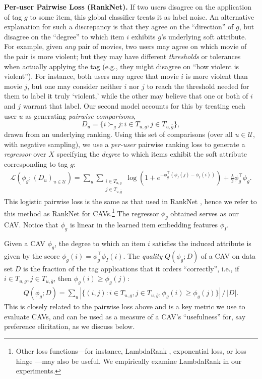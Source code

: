 \documentclass[manuscript,screen,nonacm]{acmart}
\newcommand{\1}{{\mathbf 1}}
\newcommand{\calU}{\mathcal{U}}
\newcommand{\calL}{\mathcal{L}}
\newcommand{\olg}{\overline{g}}
\theoremstyle{TheoremNum}
\begin{document}
\vskip 2mm
\noindent
\textbf{Per-user Pairwise Loss (RankNet).}\hspace*{2mm}
If two users disagree on the application of tag $g$ to some item, this global classifier treats it as label noise. An alternative explanation for such a discrepancy is that they agree on the ``direction'' of $g$, but disagree on the ``degree'' to which item $i$ exhibits $g$'s underlying soft attribute. For example, given \emph{any} pair of movies, two users may agree on which movie of the pair is more violent; but they may have different \emph{thresholds} or tolerances when actually applying the tag (e.g., they might disagree on ``how violent is violent''). For instance, both users may agree that movie $i$ is more violent than movie $j$, but one may consider neither $i$ nor $j$ to reach the threshold needed for them to label it truly `violent,' while the other may believe that one or both of $i$ and $j$ warrant that label. Our second model accounts for this by treating each user $u$ as generating \emph{pairwise comparisons}, 
$$D_u = \{i \succ_g j: i\in T_{u,g}, j\in T_{u,\olg} \},$$
drawn from an underlying ranking.
Using this set of comparisons (over all $u\in\calU$, with negative sampling),
we use a \emph{per-user} pairwise ranking loss to generate a \emph{regressor} over $X$ specifying the
\emph{degree} to which items exhibit the
 soft attribute corresponding to tag $g$:
\begin{align}
\calL(\phi_g; (D_u)_{u\in\calU}) = \!\!\sum_u \sum_{\substack{i\in T_{u,g}\\ j\in T_{u,\olg}}} \!\!\log (1 + e^{- \phi_g^\top(\phi_I(j) - \phi_I(i))})\! +\! \frac{\lambda}{2} \phi_g^\top \phi_g.
\label{eq:rankingloss}
\end{align}
This logistic pairwise loss is the same as that used in RankNet \cite{RankNet2005}, hence we refer to this method as RankNet for CAVs.\footnote{Other loss functions---for instance, LambdaRank \cite{burges2010ranknet}, exponential loss, or loss hinge \cite{cao2006adapting}---may also be useful. We empirically examine LambdaRank in our experiments.}
The regressor $\phi_g$ obtained serves as our CAV. Notice that $\phi_g$ is linear in the learned item embedding features $\phi_I$.

Given a CAV $\phi_g$, the degree to which an item $i$ satisfies the induced attribute is given by the score $\phi_g(i) = \phi_g^\top \phi_I(i)$. The \emph{quality} $Q(\phi_g; D)$ of a CAV on data set $D$ is the fraction of the tag applications that it orders ``correctly'', i.e., if $i\!\in\! T_{u,g}, j\!\in\! T_{u,\olg}$, then $\phi_g(i)\! \geq\! \phi_g(j)$:
\begin{align}
Q(\phi_g;D) = \sum_u\! |\{(i,j)\! :\! i\!\in\! T_{u,g}, j\!\in\! T_{u,\olg}, \phi_g(i)\! \geq\! \phi_g(j)\}|\, / \, |D|.
\end{align}
This is closely related to the pairwise loss above and is a key metric we use to evaluate CAVs, and can be used as a measure of a CAV's ``usefulness'' for, say preference elicitation, as we discuss below.
\end{document}
